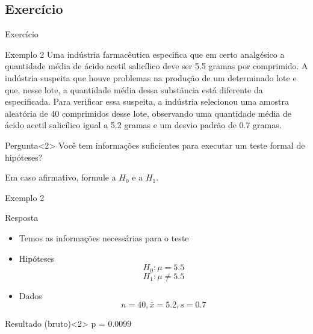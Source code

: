 \documentclass{beamer}
\begin{document}

\subsection{Exercício}

\begin{frame}{\scriptsize Exercício}
  \begin{exampleblock}{Exemplo 2}
    \footnotesize
    Uma indústria farmacêutica especifica que em certo analgésico a
    quantidade média de ácido acetil salicílico deve ser 5.5 gramas
    por comprimido. A indústria suspeita que houve problemas na
    produção de um determinado lote e que, nesse lote, a quantidade
    média dessa substância está diferente da especificada. Para
    verificar essa suspeita, a indústria selecionou uma amostra
    aleatória de 40 comprimidos desse lote, observando uma quantidade
    média de ácido acetil salicílico igual a 5.2 gramas e um desvio
    padrão de 0.7 gramas.
  \end{exampleblock}
  \begin{block}{Pergunta}<2>
    \footnotesize
    Você tem informações suficientes para executar um teste formal de hipóteses?

    Em caso afirmativo, formule a $H_0$ e a $H_1$.
  \end{block}
\end{frame}

\begin{frame}{\scriptsize Exemplo 2}
  \begin{exampleblock}{Resposta}
    \footnotesize
    \begin{itemize}
    \footnotesize
  \item Temos as informações necessárias para o teste
  \item Hipóteses
      \begin{displaymath}
        H_0: \mu = 5.5
      \end{displaymath}
      \begin{displaymath}
        H_1: \mu \ne 5.5
      \end{displaymath}
    \item Dados
      \begin{displaymath}
        n=40, \bar{x} = 5.2, s = 0.7
      \end{displaymath}
    \end{itemize}
  \end{exampleblock}
  \begin{exampleblock}{Resultado (bruto)}<2>
    \footnotesize
    p = 0.0099
  \end{exampleblock}
\end{frame}
\end{document}
